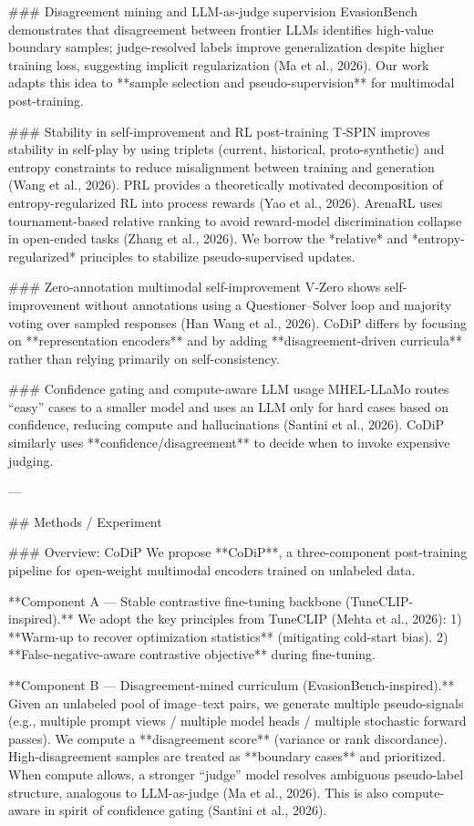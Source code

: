### Disagreement mining and LLM-as-judge supervision  
EvasionBench demonstrates that disagreement between frontier LLMs identifies high-value boundary samples; judge-resolved labels improve generalization despite higher training loss, suggesting implicit regularization (Ma et al., 2026). Our work adapts this idea to **sample selection and pseudo-supervision** for multimodal post-training.

### Stability in self-improvement and RL post-training  
T‑SPIN improves stability in self-play by using triplets (current, historical, proto-synthetic) and entropy constraints to reduce misalignment between training and generation (Wang et al., 2026). PRL provides a theoretically motivated decomposition of entropy-regularized RL into process rewards (Yao et al., 2026). ArenaRL uses tournament-based relative ranking to avoid reward-model discrimination collapse in open-ended tasks (Zhang et al., 2026). We borrow the *relative* and *entropy-regularized* principles to stabilize pseudo-supervised updates.

### Zero-annotation multimodal self-improvement  
V‑Zero shows self-improvement without annotations using a Questioner–Solver loop and majority voting over sampled responses (Han Wang et al., 2026). CoDiP differs by focusing on **representation encoders** and by adding **disagreement-driven curricula** rather than relying primarily on self-consistency.

### Confidence gating and compute-aware LLM usage  
MHEL-LLaMo routes “easy” cases to a smaller model and uses an LLM only for hard cases based on confidence, reducing compute and hallucinations (Santini et al., 2026). CoDiP similarly uses **confidence/disagreement** to decide when to invoke expensive judging.

---

## Methods / Experiment  

### Overview: CoDiP  
We propose **CoDiP**, a three-component post-training pipeline for open-weight multimodal encoders trained on unlabeled data.

**Component A — Stable contrastive fine-tuning backbone (TuneCLIP-inspired).**  
We adopt the key principles from TuneCLIP (Mehta et al., 2026):  
1) **Warm-up to recover optimization statistics** (mitigating cold-start bias).  
2) **False-negative-aware contrastive objective** during fine-tuning.

**Component B — Disagreement-mined curriculum (EvasionBench-inspired).**  
Given an unlabeled pool of image–text pairs, we generate multiple pseudo-signals (e.g., multiple prompt views / multiple model heads / multiple stochastic forward passes). We compute a **disagreement score** (variance or rank discordance). High-disagreement samples are treated as **boundary cases** and prioritized. When compute allows, a stronger “judge” model resolves ambiguous pseudo-label structure, analogous to LLM-as-judge (Ma et al., 2026). This is also compute-aware in spirit of confidence gating (Santini et al., 2026).

